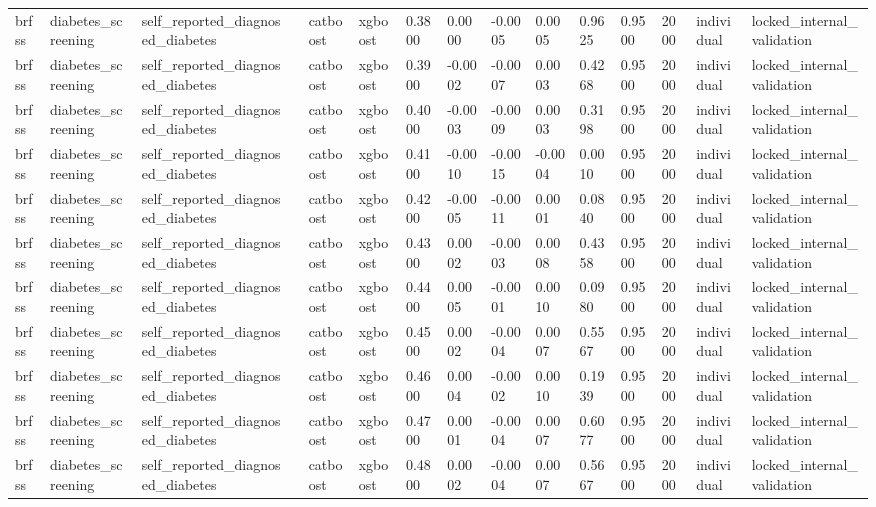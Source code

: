 \begin{tabular}{lllllllllllllll}
brfss & diabetes\_screening & self\_reported\_diagnosed\_diabetes &  & catboost & xgboost & 0.3800 & 0.0000 & -0.0005 & 0.0005 & 0.9625 & 0.9500 & 2000 & individual & locked\_internal\_validation \\
brfss & diabetes\_screening & self\_reported\_diagnosed\_diabetes &  & catboost & xgboost & 0.3900 & -0.0002 & -0.0007 & 0.0003 & 0.4268 & 0.9500 & 2000 & individual & locked\_internal\_validation \\
brfss & diabetes\_screening & self\_reported\_diagnosed\_diabetes &  & catboost & xgboost & 0.4000 & -0.0003 & -0.0009 & 0.0003 & 0.3198 & 0.9500 & 2000 & individual & locked\_internal\_validation \\
brfss & diabetes\_screening & self\_reported\_diagnosed\_diabetes &  & catboost & xgboost & 0.4100 & -0.0010 & -0.0015 & -0.0004 & 0.0010 & 0.9500 & 2000 & individual & locked\_internal\_validation \\
brfss & diabetes\_screening & self\_reported\_diagnosed\_diabetes &  & catboost & xgboost & 0.4200 & -0.0005 & -0.0011 & 0.0001 & 0.0840 & 0.9500 & 2000 & individual & locked\_internal\_validation \\
brfss & diabetes\_screening & self\_reported\_diagnosed\_diabetes &  & catboost & xgboost & 0.4300 & 0.0002 & -0.0003 & 0.0008 & 0.4358 & 0.9500 & 2000 & individual & locked\_internal\_validation \\
brfss & diabetes\_screening & self\_reported\_diagnosed\_diabetes &  & catboost & xgboost & 0.4400 & 0.0005 & -0.0001 & 0.0010 & 0.0980 & 0.9500 & 2000 & individual & locked\_internal\_validation \\
brfss & diabetes\_screening & self\_reported\_diagnosed\_diabetes &  & catboost & xgboost & 0.4500 & 0.0002 & -0.0004 & 0.0007 & 0.5567 & 0.9500 & 2000 & individual & locked\_internal\_validation \\
brfss & diabetes\_screening & self\_reported\_diagnosed\_diabetes &  & catboost & xgboost & 0.4600 & 0.0004 & -0.0002 & 0.0010 & 0.1939 & 0.9500 & 2000 & individual & locked\_internal\_validation \\
brfss & diabetes\_screening & self\_reported\_diagnosed\_diabetes &  & catboost & xgboost & 0.4700 & 0.0001 & -0.0004 & 0.0007 & 0.6077 & 0.9500 & 2000 & individual & locked\_internal\_validation \\
brfss & diabetes\_screening & self\_reported\_diagnosed\_diabetes &  & catboost & xgboost & 0.4800 & 0.0002 & -0.0004 & 0.0007 & 0.5667 & 0.9500 & 2000 & individual & locked\_internal\_validation \\

\end{tabular}
